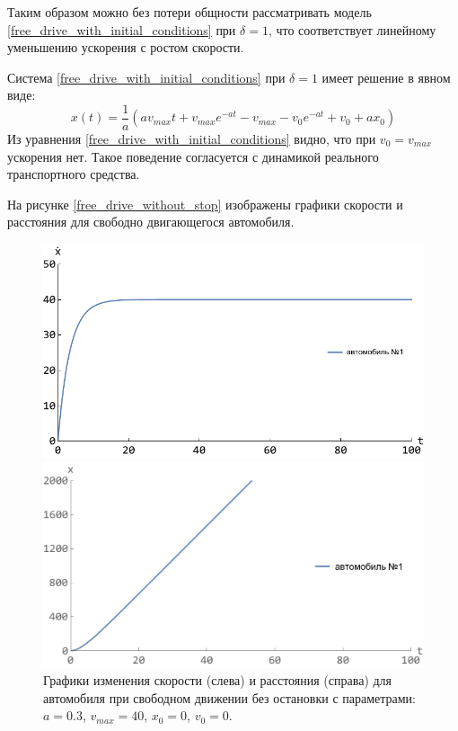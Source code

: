 \documentclass[12pt, a4paper]{extarticle}
\numberwithin{equation}{section}
\begin{document}
Таким образом можно без потери общности рассматривать модель \eqref{free_drive_with_initial_conditions} при $\delta=1$, что соответствует линейному уменьшению ускорения с ростом скорости.

Система \eqref{free_drive_with_initial_conditions} при $\delta=1$ имеет решение в явном виде:
\begin{equation*}
x(t) =\dfrac{1}{a}\left(av_{max}t+v_{max}e^{-at}-v_{max}-v_0e^{-at}+v_0+ax_0\right) 
\end{equation*}
Из уравнения \eqref{free_drive_with_initial_conditions} видно, что при $v_0=v_{max}$ ускорения нет. Такое поведение согласуется с динамикой реального транспортного средства.

На рисунке \eqref{free_drive_without_stop} изображены графики скорости и расстояния для свободно двигающегося автомобиля.
\begin{figure}[h!]
	\begin{center}
		\begin{minipage}[h!]{0.48\linewidth}
			\includegraphics[width=1\linewidth,height=0.2\textheight]
			{Images/free_drive_speed.pdf}
		\end{minipage}
		\hfill 
		\begin{minipage}[h!]{0.48\linewidth}
			\includegraphics[width=1\linewidth,height=0.2\textheight]
			{Images/free_drive_distance.pdf}
		\end{minipage}
		\caption{Графики изменения скорости (слева) и расстояния (справа) для автомобиля при свободном движении без остановки с параметрами: $a=0.3$, $v_{max}=40$, $x_0=0$, $v_0=0$.}
		\label{free_drive_without_stop}
	\end{center}
\end{figure}
\end{document}
